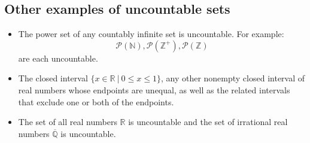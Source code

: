 \documentclass[12pt, oneside]{article}
\begin{document}
  \subsection*{Other examples of uncountable sets}


\begin{itemize}
    \item The power set of any countably infinite set is uncountable. For example:
    \[
        \mathcal{P}(\mathbb{N}), \mathcal{P}(\mathbb{Z^+}), \mathcal{P}(\mathbb{Z})
    \]
    are each uncountable.
    \item The closed interval $\{x \in \mathbb{R} ~|~ 0 \leq x \leq 1\}$, any other nonempty closed interval of real numbers whose endpoints are 
    unequal, as well as the related intervals that exclude one or both of the endpoints.
    \item The set of all real numbers $\mathbb{R}$ is uncountable and the set of irrational
    real numbers $\overline{\mathbb{Q}}$ is uncountable.
\end{itemize} 
\end{document}
